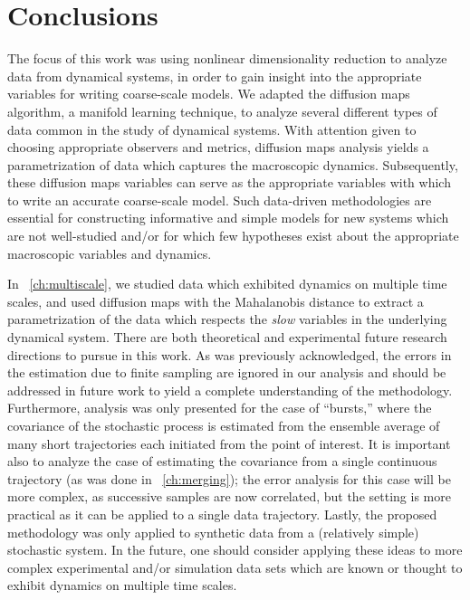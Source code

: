 
\chapter{Conclusions \label{ch:conclusion}}


The focus of this work was using nonlinear dimensionality reduction to analyze data from dynamical systems, in order to gain insight into the appropriate variables for writing coarse-scale models.
%
We adapted the diffusion maps algorithm, a manifold learning technique, to analyze several different types of data common in the study of dynamical systems.
%
With attention given to choosing appropriate observers and metrics, diffusion maps analysis yields a parametrization of data which captures the macroscopic dynamics.
%
Subsequently,  these diffusion maps variables can serve as the appropriate variables with which to write an accurate coarse-scale model.
%
Such data-driven methodologies are essential for constructing informative and simple models for new systems which are not well-studied and/or for which few hypotheses exist about the appropriate macroscopic variables and dynamics.

In \chap~\ref{ch:multiscale}, we studied data which exhibited dynamics on multiple time scales, and used diffusion maps with the Mahalanobis distance to extract a parametrization of the data which respects the {\em slow} variables in the underlying dynamical system.
%
There are both theoretical and experimental future research directions to pursue in this work.
%
As was previously acknowledged, the errors in the estimation due to finite sampling are ignored in our analysis and should be addressed in future work to yield a complete understanding of the methodology.
%
Furthermore, analysis was only presented for the case of ``bursts,'' where the covariance of the stochastic process is estimated from the ensemble average of many short trajectories each initiated from the point of interest.
%
It is important also to analyze the case of estimating the covariance from a single continuous trajectory (as was done in \chap~\ref{ch:merging}); the error analysis for this case will be more complex, as successive samples are now correlated, but the setting is more practical as it can be applied to a single data trajectory.
%
Lastly, the proposed methodology was only applied to synthetic data from a (relatively simple) stochastic system. 
%
In the future, one should consider applying these ideas to more complex experimental and/or simulation data sets which are known or thought to exhibit dynamics on multiple time scales.

